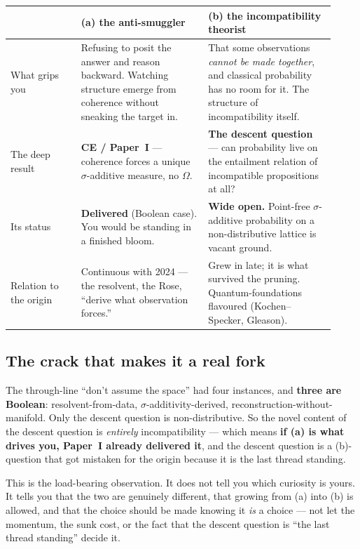 \documentclass[11pt]{article}
\theoremstyle{remark}
\begin{document}
\begin{center}
\renewcommand{\arraystretch}{1.5}
\begin{tabular}{@{}p{0.20\linewidth} p{0.36\linewidth} p{0.36\linewidth}@{}}
\toprule
 & \textbf{(a) the anti-smuggler} & \textbf{(b) the incompatibility theorist}\\
\midrule
What grips you &
Refusing to posit the answer and reason backward. Watching structure emerge from
coherence without sneaking the target in. &
That some observations \emph{cannot be made together}, and classical probability
has no room for it. The structure of incompatibility itself.\\
The deep result &
\textbf{CE / Paper~I} --- coherence forces a unique $\sigma$-additive measure, no
$\Omega$. &
\textbf{The descent question} --- can probability live on the entailment relation
of incompatible propositions at all?\\
Its status &
\textbf{Delivered} (Boolean case). You would be standing in a finished bloom. &
\textbf{Wide open.} Point-free $\sigma$-additive probability on a
non-distributive lattice is vacant ground.\\
Relation to the origin &
Continuous with 2024 --- the resolvent, the Rose, ``derive what observation
forces.'' &
Grew in late; it is what survived the pruning. Quantum-foundations flavoured
(Kochen--Specker, Gleason).\\
\bottomrule
\end{tabular}
\end{center}

\subsection{The crack that makes it a real fork}

The through-line ``don't assume the space'' had four instances, and \textbf{three
are Boolean}: resolvent-from-data, $\sigma$-additivity-derived,
reconstruction-without-manifold. Only the descent question is non-distributive.
So the novel content of the descent question is \emph{entirely} incompatibility
--- which means \textbf{if (a) is what drives you, Paper~I already delivered it},
and the descent question is a (b)-question that got mistaken for the origin
because it is the last thread standing.

This is the load-bearing observation. It does not tell you which curiosity is
yours. It tells you that the two are genuinely different, that growing from (a)
into (b) is allowed, and that the choice should be made knowing it \emph{is} a
choice --- not let the momentum, the sunk cost, or the fact that the descent
question is ``the last thread standing'' decide it.
\end{document}
